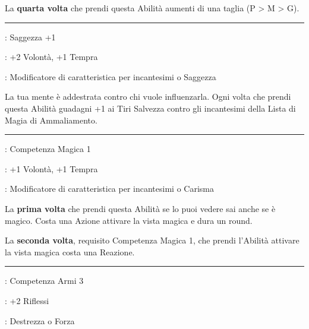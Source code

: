 \begin{multicols}{2}
La \textbf{quarta volta} che prendi questa Abilità aumenti di una taglia (P > M > G).

\smallskip\noindent\rule{\linewidth}{2pt} \hypertarget{Muro mentale}{}\medskip{}
\noindent
\begin{description}[noitemsep, topsep=0pt, parsep=0pt, partopsep=0pt, leftmargin=0cm, labelwidth=2.5cm]
    \item[\textbf{Requisito}]: Saggezza +1
    \item[\textbf{Tiri Salvezza}]: +2 Volontà, +1 Tempra
    \item[\textbf{Caratteristica}]: Modificatore di caratteristica per incantesimi o Saggezza
\end{description}

La tua mente è addestrata contro chi vuole influenzarla. Ogni volta che prendi questa Abilità guadagni +1 ai Tiri Salvezza contro gli incantesimi della Lista di Magia di Ammaliamento.

\smallskip\noindent\rule{\linewidth}{2pt} \hypertarget{Occhi della magia}{}\medskip{}
\noindent
\begin{description}[noitemsep, topsep=0pt, parsep=0pt, partopsep=0pt, leftmargin=0cm, labelwidth=2.5cm]
    \item[\textbf{Requisito}]: Competenza Magica 1
    \item[\textbf{Tiri Salvezza}]: +1 Volontà, +1 Tempra
    \item[\textbf{Caratteristica}]: Modificatore di caratteristica per incantesimi o Carisma
\end{description}

La \textbf{prima volta} che prendi questa Abilità se lo puoi vedere sai anche se è magico. Costa una Azione attivare la vista magica e dura un round.

La \textbf{seconda volta}, requisito Competenza Magica 1, che prendi l'Abilità attivare la vista magica costa una Reazione.
\smallskip\noindent\rule{\linewidth}{2pt} \hypertarget{Occhio Clinico}{}\medskip{}
\noindent
\begin{description}[noitemsep, topsep=0pt, parsep=0pt, partopsep=0pt, leftmargin=0cm, labelwidth=2.5cm]
    \item[\textbf{Requisito}]: Competenza Armi 3
    \item[\textbf{Tiri Salvezza}]: +2 Riflessi
    \item[\textbf{Caratteristica}]: Destrezza o Forza
\end{description}


\end{multicols}
